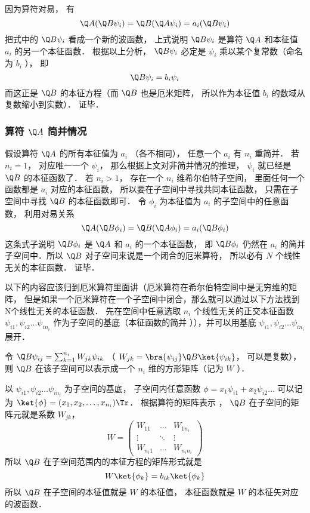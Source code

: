 因为算符对易， 有
\begin{equation}
\Q A (\Q B \psi_i) = \Q B (\Q A \psi_i) = a_i (\Q B \psi_i)
\end{equation}
把式中的 $\Q B \psi_i$ 看成一个新的波函数， 上式说明 $\Q B \psi_i$ 是算符 $\Q A$ 和本征值 $a_i$ 的另一个本征函数． 根据以上分析， $\Q B \psi_i$ 必定是 $\psi_i$ 乘以某个复常数（命名为 $b_i$ ）， 即
\begin{equation}
\Q B \psi_i = b_i \psi_i
\end{equation}
而这正是 $\Q B$ 的本征方程（而 $\Q B$ 也是厄米矩阵， 所以作为本征值 $b_i$ 的数域从复数缩小到实数）． 证毕．

\subsubsection{算符 $\Q A$ 简并情况}
假设算符 $\Q A$ 的所有本征值为 $a_i$ （各不相同）， 任意一个 $a_i$ 有 $n_i$ 重简并． 若 $n_i = 1$，  对应唯一一个 $\psi_i$，  那么根据上文对非简并情况的推理， $\psi_i$ 就已经是 $\Q B$ 的本征函数了． 若 $n_i > 1$，  存在一个 $n_i$ 维希尔伯特子空间， 里面任何一个函数都是 $a_i$ 对应的本征函数， 所以要在子空间中寻找共同本征函数， 只需在子空间中寻找 $\Q B$ 的本征函数即可． 令 $\phi_i$ 为本征值为 $a_i$ 的子空间中的任意函数， 利用对易关系
\begin{equation}
\Q A (\Q B \phi_i) = \Q B (\Q A \phi_i) = a_i (\Q B \phi_i)
\end{equation}
这条式子说明 $\Q B \phi_i$ 是 $\Q A$ 和 $a_i$ 的一个本征函数， 即 $\Q B \phi_i$ 仍然在 $a_i$ 的简并子空间中．所以 $\Q B$ 对子空间来说是一个闭合的厄米算符， 所以必有 $N$ 个线性无关的本征函数． 证毕．%

以下的内容应该归到厄米算符里面讲（厄米算符在希尔伯特空间中是无穷维的矩阵， 但是如果一个厄米算符在一个子空间中闭合，那么就可以通过以下方法找到N个线性无关的本征函数．%
先在空间中任意选取 $n_i$ 个线性无关的正交本征函数 $\psi_{i1}, \psi_{i2}\dots \psi_{i n_i}$ 作为子空间的基底（本征函数的简并%
）），并可以用基底 $\psi_{i1}, \psi_{i2}\dots \psi_{i n_i}$ 展开．

令 $\Q B \psi_{ij} = \sum_{k=1}^{n_i} W_{jk}\psi_{ik}$ （ $W_{jk} = \bra{\psi_{ij}} \Q B \ket{\psi_{ik}}$， 可以是复数）， 则 $\Q B$ 在该子空间可以表示成一个 $n_i$ 维的方形矩阵（记为 $W$ ）．

以 $\psi_{i1}, \psi_{i2} \dots \psi_{i n_i}$ 为子空间的基底， 子空间内任意函数 $\phi  = x_1 \psi_{i1} + x_2 \psi_{i2}\dots$ 可以记为 $\ket{\phi} = (x_1, x_2, \dots, x_{n_i})\Tr$． 根据算符的矩阵表示
， $\Q B$ 在子空间的矩阵元就是系数 $W_{jk}$， 
\begin{equation}
W = \begin{pmatrix}
W_{11} & \ldots & W_{1 n_i}\\
\vdots & \ddots & \vdots \\
W_{n_i 1} & \ldots & W_{n_i n_i}
\end{pmatrix}
\end{equation}
所以 $\Q B$ 在子空间范围内的本征方程的矩阵形式就是
\begin{equation}
W \ket{\phi_k} = b_{ik} \ket{\phi_k}
\end{equation}
所以 $\Q B$ 在子空间的本征值就是 $W$ 的本征值， 本征函数就是 $W$ 的本征矢对应的波函数．

